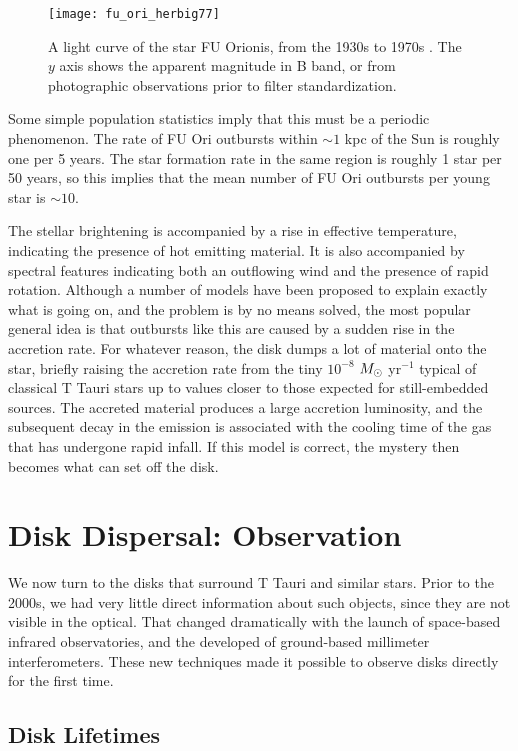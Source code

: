 \begin{figure}
\texttt{[image: fu\_ori\_herbig77]}
\caption[Long-term light curve of FU Orionis]{
\label{fig:fu_ori_herbig77}
A light curve of the star FU Orionis, from the 1930s to 1970s \citep{herbig77a}. The $y$ axis shows the apparent magnitude in B band, or from photographic observations prior to filter standardization.
}
\end{figure}

Some simple population statistics imply that this must be a periodic phenomenon. The rate of FU Ori outbursts within $\sim 1$ kpc of the Sun is roughly one per 5 years. The star formation rate in the same region is roughly 1 star per 50 years, so this implies that the mean number of FU Ori outbursts per young star is $\sim 10$.

The stellar brightening is accompanied by a rise in effective temperature, indicating the presence of hot emitting material. It is also accompanied by spectral features indicating both an outflowing wind and the presence of rapid rotation. Although a number of models have been proposed to explain exactly what is going on, and the problem is by no means solved, the most popular general idea is that outbursts like this are caused by a sudden rise in the accretion rate. For whatever reason, the disk dumps a lot of material onto the star, briefly raising the accretion rate from the tiny $10^{-8}$ $M_{\odot}$ yr$^{-1}$ typical of classical T Tauri stars up to values closer to those expected for still-embedded sources. The accreted material produces a large accretion luminosity, and the subsequent decay in the emission is associated with the cooling time of the gas that has undergone rapid infall. If this model is correct, the mystery then becomes what can set off the disk.

\section{Disk Dispersal: Observation}

We now turn to the disks that surround T Tauri and similar stars. Prior to the 2000s, we had very little direct information about such objects, since they are not visible in the optical. That changed dramatically with the launch of space-based infrared observatories, and the developed of ground-based millimeter interferometers. These new techniques made it possible to observe disks directly for the first time.

\subsection{Disk Lifetimes}

